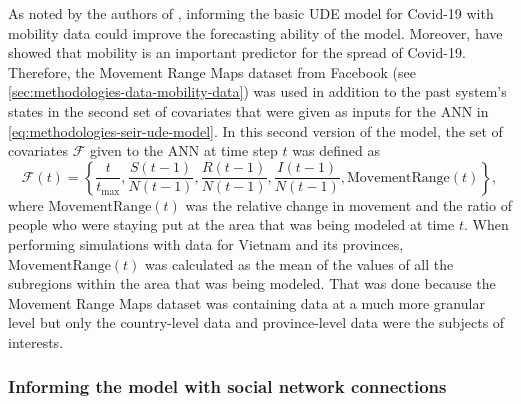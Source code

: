 As noted by the authors of \cite{dandekarMachineLearningAidedGlobal2020a}, informing the basic \gls{UDE} model for Covid-19 with mobility data could improve the forecasting ability of the model.
Moreover, \cite{changMobilityNetworkModels2021,ihmecovid-19forecastingteamModelingCOVID19Scenarios2021,liSubstantialUndocumentedInfection2020} have showed that mobility is an important predictor for the spread of Covid-19.
Therefore, the Movement Range Maps dataset from Facebook (see \autoref{sec:methodologies-data-mobility-data}) was used in addition to the past system's states in the second set of covariates that were given as inputs for the \gls{ANN} in \autoref{eq:methodologies-seir-ude-model}.
In this second version of the model, the set of covariates $\mathcal{F}$ given to the \gls{ANN} at time step $t$ was defined as
\begin{equation*}
    \mathcal{F}(t) = \left\lbrace \frac{t}{t_\text{max}}, \frac{S(t-1)}{N(t-1)}, \frac{R(t-1)}{N(t-1)}, \frac{I(t-1)}{N(t-1)}, \text{MovementRange}(t) \right\rbrace,
\end{equation*}
where $\text{MovementRange}(t)$ was the relative change in movement and the ratio of people who were staying put at the area that was being modeled at time $t$.
When performing simulations with data for Vietnam and its provinces, $\text{MovementRange}(t)$ was calculated as the mean of the values of all the subregions within the area that was being modeled.
That was done because the Movement Range Maps dataset was containing data at a much more granular level but only the country-level data and province-level data were the subjects of interests.

\subsubsection{Informing the model with social network connections}

